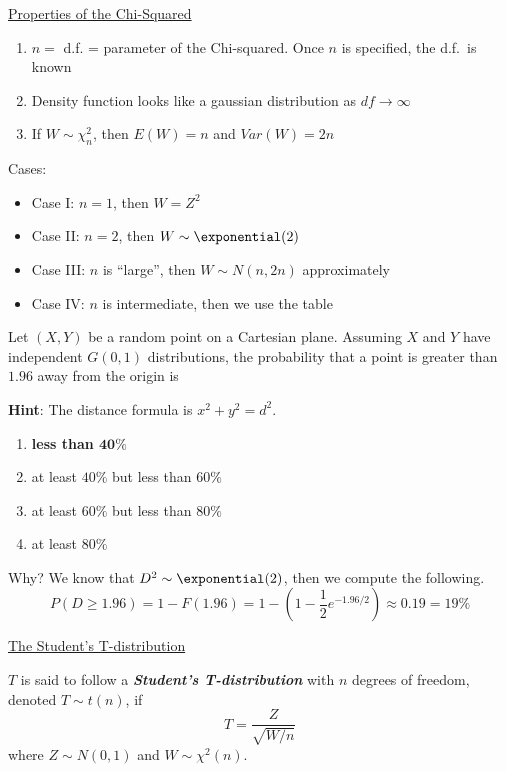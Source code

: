 \underline{Properties of the Chi-Squared}
\begin{enumerate}[label=(\roman*)]
    \item $ n= $ d.f. = parameter of the Chi-squared. Once $ n $ is specified, the d.f.\ is known
    \item Density function looks like a gaussian distribution as $ df\rightarrow\infty $
    \item If $ W \sim \chi^2_n $, then $ E(W)=n $ and $ Var(W)=2n $
\end{enumerate}
Cases:
\begin{itemize}
    \item Case I\@: $ n=1 $, then $ W=Z^2 $
    \item Case II\@: $ n=2 $, then $ W \sim \exponential(2) $
    \item Case III\@: $ n $ is ``large'', then $ W \sim N(n,2n) $ approximately
    \item Case IV\@: $ n $ is intermediate, then we use the table
\end{itemize}

Let $ (X,Y) $ be a random point on a Cartesian plane. Assuming $ X $ and $ Y $
have independent $ G(0,1) $ distributions, the probability that a point is greater
than $ 1.96 $ away from the origin is

\textbf{Hint}: The distance formula is $ x^2+y^2=d^2 $.
\begin{enumerate}[label=(\Alph*)]
    \item \textbf{less than $ \symbf{40\%} $}
    \item at least $ 40\% $ but less than $ 60\% $
    \item at least $ 60\% $ but less than $ 80\% $
    \item at least $ 80\% $
\end{enumerate}
Why? We know that $ D^2 \sim \exponential(2) $, then we compute the following.
\[ P(D\geqslant 1.96)=1-F(1.96)=1-\left( 1-\frac{1}{2} e^{-1.96/2} \right)\approx 0.19=19\% \]

\underline{The Student's T-distribution}

\begin{Definition}{}{}
    $ T $ is said to follow a \textbf{\emph{Student's T-distribution}} with
    $ n $ degrees of freedom, denoted $ T \sim t(n) $, if
    \[ T=\frac{Z}{\sqrt{W/n}}  \]
    where $ Z \sim N(0,1) $ and $ W \sim \chi^2(n) $.
\end{Definition}

